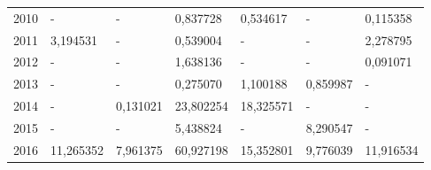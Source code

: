 \begin{table}
\begin{tabular}{p{1cm}p{2cm}p{2cm}p{2cm}p{2cm}p{2cm}p{2cm}}
 2010 &                                    - &                         - &                                      0,837728 &                    0,534617 &                                          - &                                    0,115358 \\
 2011 &                             3,194531 &                         - &                                      0,539004 &                           - &                                          - &                                    2,278795 \\
 2012 &                                    - &                         - &                                      1,638136 &                           - &                                          - &                                    0,091071 \\
 2013 &                                    - &                         - &                                      0,275070 &                    1,100188 &                                   0,859987 &                                           - \\
 2014 &                                    - &                  0,131021 &                                     23,802254 &                   18,325571 &                                          - &                                           - \\
 2015 &                                    - &                         - &                                      5,438824 &                           - &                                   8,290547 &                                           - \\
 2016 &                            11,265352 &                  7,961375 &                                     60,927198 &                   15,352801 &                                   9,776039 &                                   11,916534 \\
\bottomrule
\end{tabular}
\end{table}

